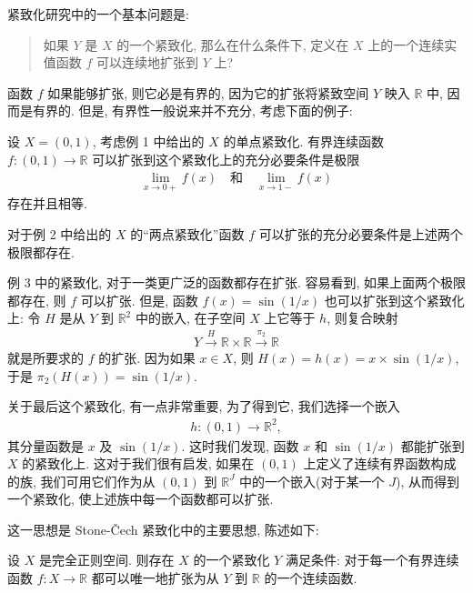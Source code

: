 \documentclass[../../main.tex]{subfiles}
\begin{document}
紧致化研究中的一个基本问题是:

\begin{quote}
如果 $Y$ 是 $X$ 的一个紧致化, 那么在什么条件下, 定义在 $X$ 上的一个连续实值函数 $f$ 可以连续地扩张到 $Y$ 上?
\end{quote}

函数 $f$ 如果能够扩张, 则它必是有界的, 因为它的扩张将紧致空间 $Y$ 映入 $\mathbb{R}$ 中, 因而是有界的. 但是, 有界性一般说来并不充分, 考虑下面的例子:

\begin{examples}
设 $X=(0,1)$, 考虑例 1 中给出的 $X$ 的单点紧致化. 有界连续函数 $f\colon(0,1)\to\mathbb{R}$ 可以扩张到这个紧致化上的充分必要条件是极限
\begin{align*}
\lim_{x\to 0+}f(x)\quad\text{和}\quad\lim_{x\to 1-}f(x)
\end{align*}
存在并且相等.
\end{examples}

对于例 2 中给出的 $X$ 的``两点紧致化''函数 $f$ 可以扩张的充分必要条件是上述两个极限都存在.

例 3 中的紧致化, 对于一类更广泛的函数都存在扩张. 容易看到, 如果上面两个极限都存在, 则 $f$ 可以扩张. 但是, 函数 $f(x)=\sin(1/x)$ 也可以扩张到这个紧致化上: 令 $H$ 是从 $Y$ 到 $\mathbb{R}^2$ 中的嵌入, 在子空间 $X$ 上它等于 $h$, 则复合映射
\begin{align*}
Y\xrightarrow{H}\mathbb{R}\times\mathbb{R}\xrightarrow{\pi_2}\mathbb{R}
\end{align*}
就是所要求的 $f$ 的扩张. 因为如果 $x\in X$, 则 $H(x)=h(x)=x\times\sin(1/x)$, 于是 $\pi_2(H(x))=\sin(1/x)$.

关于最后这个紧致化, 有一点非常重要, 为了得到它, 我们选择一个嵌入
\begin{align*}
h\colon(0,1)\longrightarrow\mathbb{R}^2,
\end{align*}
其分量函数是 $x$ 及 $\sin(1/x)$. 这时我们发现, 函数 $x$ 和 $\sin(1/x)$ 都能扩张到 $X$ 的紧致化上. 这对于我们很有启发, 如果在 $(0,1)$ 上定义了连续有界函数构成的族, 我们可用它们作为从 $(0,1)$ 到 $\mathbb{R}^J$ 中的一个嵌入(对于某一个 $J$), 从而得到一个紧致化, 使上述族中每一个函数都可以扩张.

这一思想是 Stone-Čech 紧致化中的主要思想, 陈述如下:

\begin{theorem}\label{theorem:ch05-stone-cech-existence}
设 $X$ 是完全正则空间. 则存在 $X$ 的一个紧致化 $Y$ 满足条件: 对于每一个有界连续函数 $f\colon X\to\mathbb{R}$ 都可以唯一地扩张为从 $Y$ 到 $\mathbb{R}$ 的一个连续函数.
\end{theorem}
\end{document}
